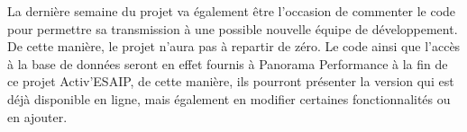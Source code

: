 La dernière semaine du projet va également être l'occasion de commenter le code pour permettre sa transmission à une possible nouvelle équipe de développement. De cette manière, le projet n'aura pas à repartir de zéro. Le code ainsi que l'accès à la base de données seront en effet fournis à Panorama Performance à la fin de ce projet Activ'ESAIP, de cette manière, ils pourront présenter la version qui est déjà disponible en ligne, mais également en modifier certaines fonctionnalités ou en ajouter.